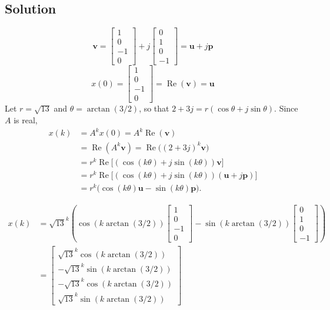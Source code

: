 \documentclass[12pt,a4paper]{article}
\begin{document}
\subsection*{Solution}
\[
\mathbf v = \begin{bmatrix}
	1 \\ 0 \\ -1 \\ 0
\end{bmatrix} + j\begin{bmatrix}
0 \\ 1 \\ 0 \\ -1
\end{bmatrix} = \mathbf u + j\mathbf p
\]
\[
x(0) = \begin{bmatrix}
	1 \\ 0 \\ -1 \\ 0
\end{bmatrix} = \operatorname{Re}(\mathbf v) = \mathbf u
\]
Let $r=\sqrt{13}$ and $\theta=\arctan(3/2)$, so that
$2+3j=r(\cos\theta+j\sin\theta)$. Since $A$ is real,
\begin{align*}
	x(k) &= A^k x(0)
    = A^k\operatorname{Re}(\mathbf v) \\
    &= \operatorname{Re}(A^k\mathbf v)
    = \operatorname{Re}\bigl((2+3j)^k\mathbf v\bigr) \\
    &= r^k\operatorname{Re}\bigl[
        (\cos(k\theta)+j\sin(k\theta))\mathbf v
       \bigr] \\
    &= r^k\operatorname{Re}\bigl[
        (\cos(k\theta)+j\sin(k\theta))(\mathbf u+j\mathbf p)
       \bigr] \\
    &= r^k\bigl(\cos(k\theta)\mathbf u-\sin(k\theta)\mathbf p\bigr).
\end{align*}

 \begin{align*}
 	x(k) &= \sqrt{13}^k \left(  \cos (k \arctan(3/2)) \begin{bmatrix}
 		1 \\ 0 \\ -1 \\ 0 
 	\end{bmatrix} - \sin(k \arctan(3/2)) \begin{bmatrix}
 	0 \\ 1 \\ 0 \\ -1 
 	\end{bmatrix} \right) \\
 	&= \begin{bmatrix}
 		\sqrt{13}^k \cos (k \arctan (3/2)) \\
 		-\sqrt{13}^k \sin(k \arctan (3/2)) \\
 		-\sqrt{13}^k \cos (k \arctan(3/2)) \\
 		\sqrt{13}^k \sin (k \arctan(3/2))
 	\end{bmatrix}
 \end{align*}
\end{document}

